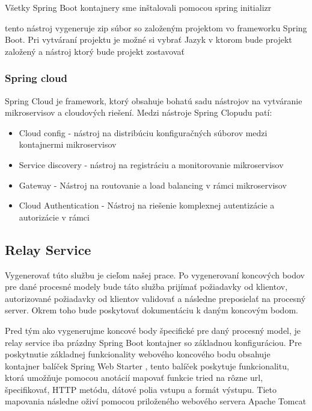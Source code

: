 
Všetky Spring Boot kontajnery sme inštalovali pomocou spring initializr \cite{initializr} 

tento nástroj vygeneruje zip súbor so založeným projektom vo frameworku Spring Boot. Pri vytváraní projektu je možné si vybrať Jazyk v ktorom bude projekt založený a nástroj ktorý bude projekt zostavovať %

\subsubsection{Spring cloud}  

Spring Cloud je framework, ktorý obsahuje bohatú sadu nástrojov na vytváranie mikroservisov a cloudových riešení. Medzi nástroje Spring Clopudu patí:   


\begin{itemize}  
	\item Cloud config - nástroj na distribúciu konfiguračných súborov medzi kontajnermi mikroservisov 
	\item Service discovery - nástroj na registráciu a monitorovanie mikroservisov  
	\item Gateway - Nástroj na routovanie a load balancing v rámci mikroservisov  	
	\item Cloud Authentication - Nástroj na riešenie komplexnej autentizácie a autorizácie v rámci  

\end{itemize}  


\subsection{Relay Service} 

Vygenerovať túto službu je cieľom našej prace. Po vygenerovaní koncových bodov pre dané procesné modely bude táto služba prijímať požiadavky od klientov, autorizované požiadavky od klientov validovať a následne preposielať na procesný server. Okrem toho bude poskytovať dokumentáciu k daným koncovým bodom. 

Pred tým ako vygenerujme koncové body špecifické pre daný procesný model, je relay service iba prázdny Spring Boot kontajner so základnou konfiguráciou. Pre poskytnutie základnej funkcionality webového koncového bodu obsahuje kontajner balíček Spring Web Starter \cite{webstarter}, tento balíček poskytuje funkcionalitu, ktorá umožňuje pomocou anotácií mapovať funkcie tried na rôzne \acrshort{url}, špecifikovať, HTTP metódu, dátové polia vstupu a formát výstupu. Tieto mapovania následne oživí pomocou priloženého webového servera Apache Tomcat \cite{tomcat} 



